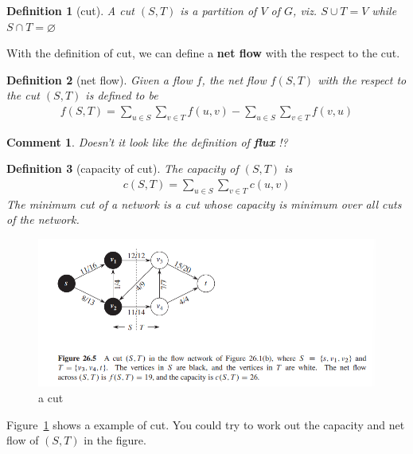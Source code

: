 \documentclass[a4paper, 10pt]{ctexart} %
\newtheorem{definition}{Definition}
\newtheorem{corollary}{Comment}
\begin{document}
\begin{definition}[cut]
    A cut $\left( S, T\right)$ is a partition of $V$ of $G$,
    viz. $S \cup T = V$ while $S \cap T = \varnothing$
\end{definition}
With the definition of cut, we can define a \textbf{net flow} 
with the respect to the cut. 
\begin{definition}[net flow]
    Given a flow $f$, the net flow $f \left(S ,T\right)$ with the 
    respect to the cut $ \left(S ,  T\right) $
    is defined to be 
    \begin{align*}
        f \left(S , T\right) = \sum_{u \in S} 
        \sum_{v \in T}  f ( u,v)
        - \sum_{u \in S}  \sum_{ v \in T} 
        f\left( v, u\right)
    \end{align*}
\end{definition}
\begin{corollary}
Doesn't it look like the definition of 
{\bfseries flux} !?
\end{corollary}
\begin{definition}[capacity of cut]
The capacity of $ \left(S ,T\right) $ is
\begin{align*}
c \left(S , T\right) = \sum_{u \in S}  \sum_{v \in T}  c \left( u ,v\right)
\end{align*}
The minimum cut of a network is a cut 
whose capacity is minimum over all cuts 
of the network.
\end{definition}
\begin{figure}[]
    \centering
    \includegraphics[scale = 0.5]{mf2.png}
    \caption{a cut}
    \label{fig:mf2}
\end{figure}
Figure~\ref{fig:mf2} shows a example of cut. 
You could try to work out the 
capacity and net flow of $(S , T)$ in the figure.
\end{document}

